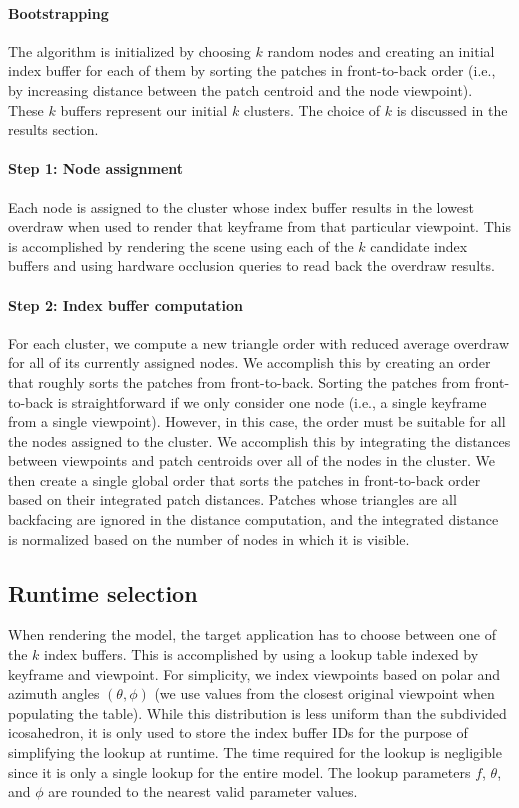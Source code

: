 \paragraph{Bootstrapping}
The algorithm is initialized by choosing $k$ random nodes and creating an initial index buffer for each of them by sorting the patches in front-to-back order (i.e., by increasing distance between the patch centroid and the node viewpoint). These $k$ buffers represent our initial $k$ clusters. The choice of $k$ is discussed in the results section.

\paragraph{Step 1: Node assignment} Each node is assigned to the cluster whose index buffer results in the lowest overdraw when used to render that keyframe from that particular viewpoint. This is accomplished by rendering the scene using each of the $k$ candidate index buffers and using hardware occlusion queries to read back the overdraw results.

\paragraph{Step 2: Index buffer computation} For each cluster, we compute a new triangle order with reduced average overdraw for all of its currently assigned nodes. We accomplish this by creating an order that roughly sorts the patches from front-to-back. 
Sorting the patches from front-to-back is straightforward if we only consider one node (i.e., a single keyframe from a single viewpoint). However, in this case, the order must be suitable for all the nodes assigned to the cluster. We accomplish this by integrating the distances between viewpoints and patch centroids over all of the nodes in the cluster. We then create a single global order that sorts the patches in front-to-back order based on their integrated patch distances. Patches whose triangles are all backfacing are ignored in the distance computation, and the integrated distance is normalized based on the number of nodes in which it is visible.




\subsection{Runtime selection}
When rendering the model, the target application has to choose between one of the $k$ index buffers. This is accomplished by using a lookup table indexed by keyframe and viewpoint. For simplicity, we index viewpoints based on polar and azimuth angles $(\theta, \phi)$ (we use values from the closest original viewpoint when populating the table). While this distribution is less uniform than the subdivided icosahedron, it is only used to store the index buffer IDs for the purpose of simplifying the lookup at runtime. The time required for the lookup is negligible since it is only a single lookup for the entire model. The lookup parameters $f$, $\theta$, and $\phi$ are rounded to the nearest valid parameter values.


